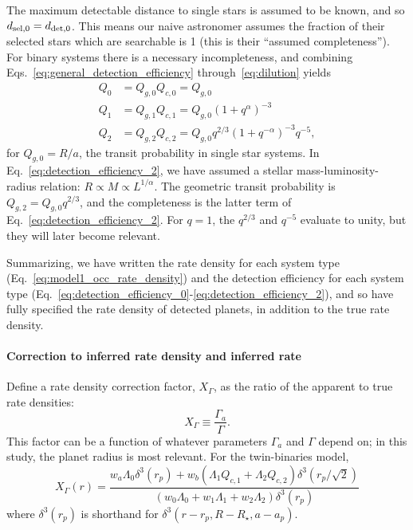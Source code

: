 The maximum detectable distance to single stars is assumed to be known, and so 
$d_{{\rm sel},0} = d_{{\rm det},0}$.
This means our naive astronomer assumes the fraction of their selected stars 
which are searchable is 1 (this is their ``assumed completeness'').
For binary systems there is a necessary incompleteness, and combining 
Eqs.~\ref{eq:general_detection_efficiency} through~\ref{eq:dilution} yields
\begin{align}
Q_0 &= Q_{g,0}Q_{c,0} = Q_{g,0} \label{eq:detection_efficiency_0}\\
Q_1 &= Q_{g,1}Q_{c,1} = Q_{g,0} (1+q^\alpha)^{-3} \\
Q_2 &= Q_{g,2}Q_{c,2} = Q_{g,0} q^{2/3} (1+q^{-\alpha})^{-3} q^{-5}, 
\label{eq:detection_efficiency_2}
\end{align}
for $Q_{g,0}=R/a$, the transit probability in single star systems.
In Eq.~\ref{eq:detection_efficiency_2}, we have assumed a stellar 
mass-luminosity-radius relation: $R\propto M \propto L^{1/\alpha}$.
The geometric transit probability is $Q_{g,2} = Q_{g,0}q^{2/3}$, and the 
completeness is the latter term of Eq.~\ref{eq:detection_efficiency_2}.
For $q=1$, the $q^{2/3}$ and $q^{-5}$ evaluate to unity, but they will later 
become relevant.

Summarizing, we have written the rate density for each system type
(Eq.~\ref{eq:model1_occ_rate_density}) and the detection efficiency for each 
system type 
(Eq.~\ref{eq:detection_efficiency_0}-\ref{eq:detection_efficiency_2}),
and so have fully specified the rate density of detected planets, 
in addition to the true rate density.




\paragraph{Correction to inferred rate density and inferred rate}

Define a rate density correction factor, $X_\Gamma$, as the ratio of the 
apparent to true rate densities:
\begin{equation}
X_\Gamma \equiv \frac{\Gamma_a}{\Gamma}.
\end{equation}
This factor can be a function of whatever parameters $\Gamma_a$ and $\Gamma$ 
depend on; in this study, the planet radius is most relevant.
For the twin-binaries model,
\begin{equation}
X_\Gamma(r)
=
\frac{w_a \Lambda_0\delta^3(r_p) + 
    w_b(\Lambda_1 Q_{c,1} + \Lambda_2 Q_{c,2}) \delta^3(r_p/\sqrt{2})  }
{(w_0\Lambda_0 + w_1\Lambda_1 + w_2\Lambda_2)\delta^3(r_p)}
\label{eq:model1_correction}
\end{equation}
where $\delta^3(r_p)$ is shorthand for $\delta^3(r-r_p,R-R_\star,a-a_p)$.

